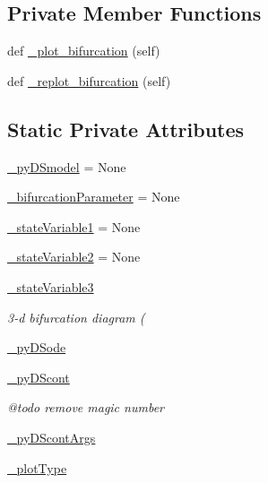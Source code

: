 \subsection*{Private Member Functions}
\begin{DoxyCompactItemize}
\item 
def \hyperlink{class_mu_mo_t_1_1_mu_mo_tbifurcation_view_a385e5f82733060fec5122635ae6a8e67}{\+\_\+plot\+\_\+bifurcation} (self)
\item 
def \hyperlink{class_mu_mo_t_1_1_mu_mo_tbifurcation_view_a13b207330e0a4fe5bb7c3b863bbd0820}{\+\_\+replot\+\_\+bifurcation} (self)
\end{DoxyCompactItemize}
\subsection*{Static Private Attributes}
\begin{DoxyCompactItemize}
\item 
\hyperlink{class_mu_mo_t_1_1_mu_mo_tbifurcation_view_a9e9a430da6d323cc4411c070e0c7eee5}{\+\_\+py\+D\+Smodel} = None
\item 
\hyperlink{class_mu_mo_t_1_1_mu_mo_tbifurcation_view_a17d5bd0e623faea6f50fc3b7f01d0d38}{\+\_\+bifurcation\+Parameter} = None
\item 
\hyperlink{class_mu_mo_t_1_1_mu_mo_tbifurcation_view_aa14fa36730691becc6f3136899545416}{\+\_\+state\+Variable1} = None
\item 
\hyperlink{class_mu_mo_t_1_1_mu_mo_tbifurcation_view_a9d3705d1d9182e10751ff693573d6d16}{\+\_\+state\+Variable2} = None
\item 
\hyperlink{class_mu_mo_t_1_1_mu_mo_tbifurcation_view_ad2f8dc44173a16468bd9d3ab335f9b27}{\+\_\+state\+Variable3}
\begin{DoxyCompactList}\small\item\em 3-\/d bifurcation diagram ( \end{DoxyCompactList}\item 
\hyperlink{class_mu_mo_t_1_1_mu_mo_tbifurcation_view_a45f0a60363e440604d8e5b08930eb7b5}{\+\_\+py\+D\+Sode}
\item 
\hyperlink{class_mu_mo_t_1_1_mu_mo_tbifurcation_view_a797e92fe19ce2636a49bf1400a69fc49}{\+\_\+py\+D\+Scont}
\begin{DoxyCompactList}\small\item\em @todo remove magic number \end{DoxyCompactList}\item 
\hyperlink{class_mu_mo_t_1_1_mu_mo_tbifurcation_view_aa56e2cffc879be68fdec55f29334415c}{\+\_\+py\+D\+Scont\+Args}
\item 
\hyperlink{class_mu_mo_t_1_1_mu_mo_tbifurcation_view_a5feff4ca83ee97d6e09874496a4975d4}{\+\_\+plot\+Type}
\end{DoxyCompactItemize}


